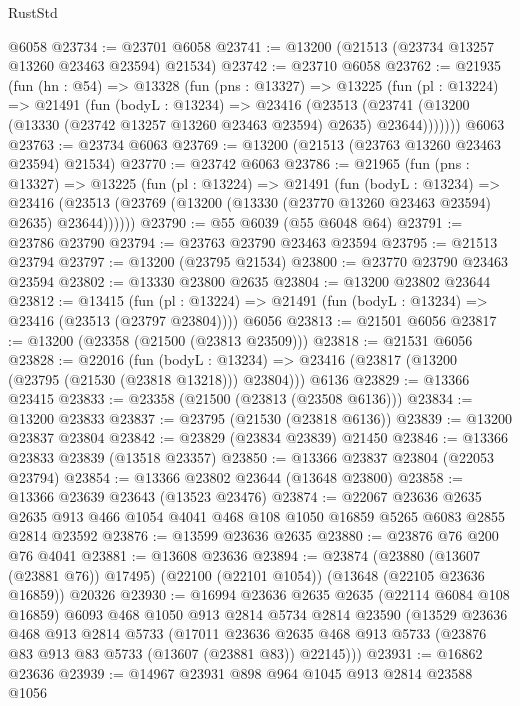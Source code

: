 \begin{lexlean}{RustStd}
\begin{coremodule}
    @6058
@23734 := @23701 @6058
@23741 := @13200 (@21513 (@23734 @13257 @13260 @23463 @23594) @21534)
@23742 := @23710 @6058
@23762 := @21935
    (fun (hn : @54) =>
    @13328
      (fun (pns : @13327) =>
      @13225
        (fun (pl : @13224) =>
        @21491
          (fun (bodyL : @13234) =>
          @23416
            (@23513
              (@23741 (@13200 (@13330 (@23742 @13257 @13260 @23463 @23594) @2635) @23644)))))))
    @6063
@23763 := @23734 @6063
@23769 := @13200 (@21513 (@23763 @13260 @23463 @23594) @21534)
@23770 := @23742 @6063
@23786 := @21965
    (fun (pns : @13327) =>
    @13225
      (fun (pl : @13224) =>
      @21491
        (fun (bodyL : @13234) =>
        @23416 (@23513 (@23769 (@13200 (@13330 (@23770 @13260 @23463 @23594) @2635) @23644))))))
@23790 := @55 @6039 (@55 @6048 @64)
@23791 := @23786 @23790
@23794 := @23763 @23790 @23463 @23594
@23795 := @21513 @23794
@23797 := @13200 (@23795 @21534)
@23800 := @23770 @23790 @23463 @23594
@23802 := @13330 @23800 @2635
@23804 := @13200 @23802 @23644
@23812 := @13415
    (fun (pl : @13224) => @21491 (fun (bodyL : @13234) => @23416 (@23513 (@23797 @23804))))
    @6056
@23813 := @21501 @6056
@23817 := @13200 (@23358 (@21500 (@23813 @23509)))
@23818 := @21531 @6056
@23828 := @22016
    (fun (bodyL : @13234) => @23416 (@23817 (@13200 (@23795 (@21530 (@23818 @13218))) @23804)))
    @6136
@23829 := @13366 @23415
@23833 := @23358 (@21500 (@23813 (@23508 @6136)))
@23834 := @13200 @23833
@23837 := @23795 (@21530 (@23818 @6136))
@23839 := @13200 @23837 @23804
@23842 := @23829 (@23834 @23839) @21450
@23846 := @13366 @23833 @23839 (@13518 @23357)
@23850 := @13366 @23837 @23804 (@22053 @23794)
@23854 := @13366 @23802 @23644 (@13648 @23800)
@23858 := @13366 @23639 @23643 (@13523 @23476)
@23874 := @22067
    @23636
    @2635
    @2635
    @913
    @466
    @1054
    @4041
    @468
    @108
    @1050
    @16859
    @5265
    @6083
    @2855
    @2814
    @23592
@23876 := @13599 @23636 @2635
@23880 := @23876 @76 @200 @76 @4041
@23881 := @13608 @23636
@23894 := @23874
    (@23880 (@13607 (@23881 @76)) @17495)
    (@22100 (@22101 @1054))
    (@13648 (@22105 @23636 @16859))
    @20326
@23930 := @16994
    @23636
    @2635
    @2635
    (@22114 @6084 @108 @16859)
    @6093
    @468
    @1050
    @913
    @2814
    @5734
    @2814
    @23590
    (@13529
      @23636
      @468
      @913
      @2814
      @5733
      (@17011
        @23636
        @2635
        @468
        @913
        @5733
        (@23876 @83 @913 @83 @5733 (@13607 (@23881 @83)) @22145)))
@23931 := @16862 @23636
@23939 := @14967 @23931 @898 @964 @1045 @913 @2814 @23588 @1056

\end{coremodule}
\end{lexlean}
